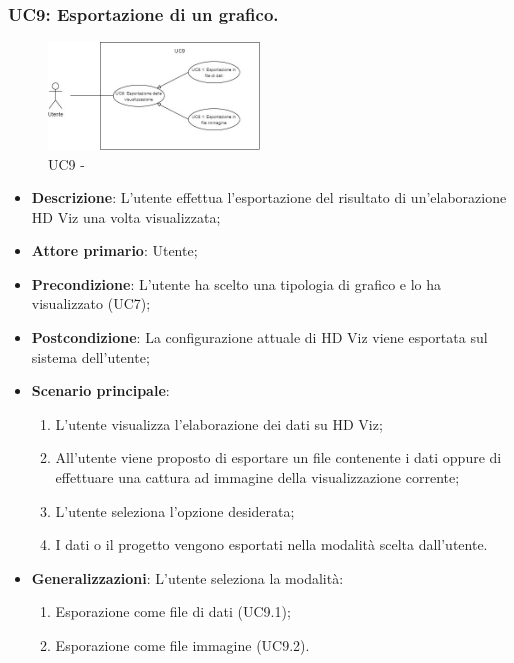 \subsubsection{UC9: Esportazione di un grafico.}
\label{sub:uc9}

\begin{figure}[h]
    \centering
    \includegraphics[width=0.5\textwidth]{componenti/casi-duso/diagrammi/UC9.jpg}
    \caption{UC9 - }
    \label{fig:UC9}
\end{figure}


\begin{itemize}
    \item{\textbf{Descrizione}}: L'utente effettua l'esportazione del risultato di un'elaborazione HD Viz una volta visualizzata;
    \item{\textbf{Attore primario}}: Utente;
    \item{\textbf{Precondizione}}: L'utente ha scelto una tipologia di grafico e lo ha visualizzato (UC7);
    \item{\textbf{Postcondizione}}: La configurazione attuale di HD Viz viene esportata sul sistema dell'utente;
    \item{\textbf{Scenario principale}}:
    \begin{enumerate}
        \item   L'utente visualizza l'elaborazione dei dati su HD Viz;
        \item   All'utente viene proposto di esportare un file contenente i dati oppure 
                di effettuare una cattura ad immagine della visualizzazione corrente;
        \item   L'utente seleziona l'opzione desiderata;
        \item   I dati o il progetto vengono esportati nella modalità scelta dall'utente.
    \end{enumerate}
    
    \item{\textbf{Generalizzazioni}}: L'utente seleziona la modalità:
    \begin{enumerate}
        \item   Esporazione come file di dati (UC9.1);
        \item   Esporazione come file immagine (UC9.2).
    \end{enumerate} 
\end{itemize}

